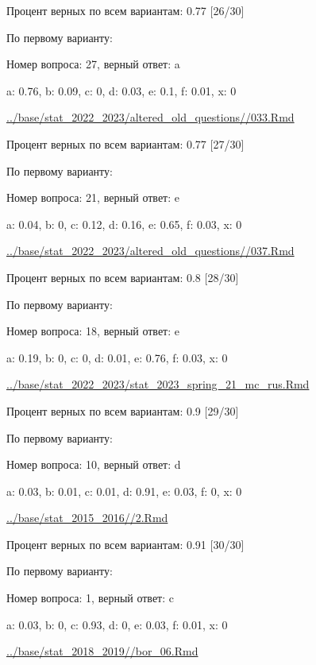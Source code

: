 Процент верных по всем вариантам: 0.77 [26/30]

По первому варианту:

Номер вопроса: 27, верный ответ: a

a: 0.76, b: 0.09, c: 0, d: 0.03, e: 0.1, f: 0.01, x: 0

\url{../base/stat_2022_2023/altered_old_questions//033.Rmd}





Процент верных по всем вариантам: 0.77 [27/30]

По первому варианту:

Номер вопроса: 21, верный ответ: e

a: 0.04, b: 0, c: 0.12, d: 0.16, e: 0.65, f: 0.03, x: 0

\url{../base/stat_2022_2023/altered_old_questions//037.Rmd}





Процент верных по всем вариантам: 0.8 [28/30]

По первому варианту:

Номер вопроса: 18, верный ответ: e

a: 0.19, b: 0, c: 0, d: 0.01, e: 0.76, f: 0.03, x: 0

\url{../base/stat_2022_2023/stat_2023_spring_21_mc_rus.Rmd}





Процент верных по всем вариантам: 0.9 [29/30]

По первому варианту:

Номер вопроса: 10, верный ответ: d

a: 0.03, b: 0.01, c: 0.01, d: 0.91, e: 0.03, f: 0, x: 0

\url{../base/stat_2015_2016//2.Rmd}





Процент верных по всем вариантам: 0.91 [30/30]

По первому варианту:

Номер вопроса: 1, верный ответ: c

a: 0.03, b: 0, c: 0.93, d: 0, e: 0.03, f: 0.01, x: 0

\url{../base/stat_2018_2019//bor_06.Rmd}



